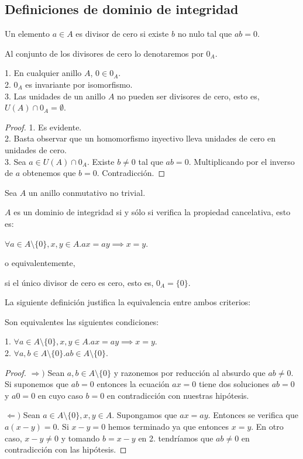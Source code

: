 \subsection{Definiciones de dominio de integridad}

\begin{definition}
Un elemento $a \in A$ es divisor de cero si existe $b$ no nulo tal que $ab = 0$. 

Al conjunto de los divisores de cero lo denotaremos por $0_A$.
\end{definition}

\begin{proposition}[Propiedades de $0_A$]
1. En cualquier anillo $A$, $0 \in 0_A$. \\
2. $0_A$ es invariante por isomorfismo. \\
3. Las unidades de un anillo $A$ no pueden ser divisores de cero, esto es, $U(A) \cap 0_A = \emptyset$.
\end{proposition}
\begin{proof}
1. Es evidente.\\
2. Basta observar que un homomorfismo inyectivo lleva unidades de cero en unidades de cero. \\
3. Sea $a \in U(A) \cap 0_A$. Existe $b \neq 0$ tal que $ab = 0$. Multiplicando por el inverso de $a$ obtenemos que $b = 0$. Contradicción.
\end{proof}

\begin{definition}
Sea $A$ un anillo conmutativo no trivial.

$A$ es un dominio de integridad si y sólo si verifica la propiedad cancelativa, esto es:

$\forall a \in A \setminus \{0\},x,y \in A. ax = ay \implies x = y$. 

o equivalentemente, 

si el único divisor de cero es cero, esto es, $0_A = \{0\}$. 
\end{definition}

La siguiente definición justifica la equivalencia entre ambos criterios:

\begin{proposition}
Son equivalentes las siguientes condiciones:

1. $\forall a \in A \setminus \{0\},x,y \in A. ax = ay \implies x = y$. \\
2. $\forall a,b \in A \setminus \{0\}. ab \in A \setminus \{0\}$.
\end{proposition}
\begin{proof}
$\Rightarrow)$ Sean $a,b \in A \setminus \{0\}$ y razonemos por reducción al absurdo que $ab \neq 0$. Si suponemos que $ab = 0$ entonces la ecuación $ax = 0$ tiene dos soluciones $ab = 0$ y $a0 = 0$ en cuyo caso $b = 0$ en contradicción con nuestras hipótesis. 

$\Leftarrow)$ Sean $a \in A \setminus \{0\},x,y \in A$. Supongamos que $ax = ay$. Entonces se verifica que $a(x-y) = 0$. Si $x-y = 0$ hemos terminado ya que entonces $x = y$. En otro caso, $x-y \neq 0$ y tomando $b = x-y$ en 2. tendríamos que $ab \neq 0$ en contradicción con las hipótesis. 
\end{proof}

